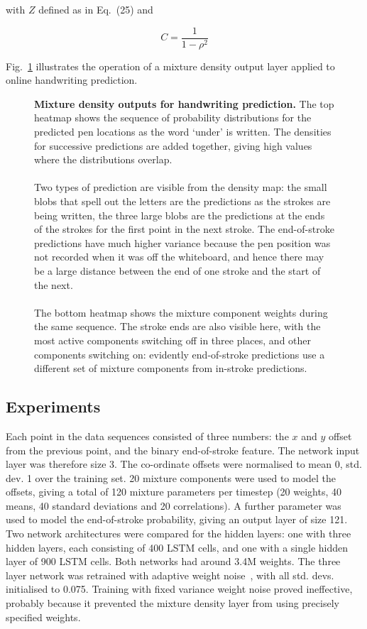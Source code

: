 with $Z$ defined as in Eq.~(25) and

\begin{equation}
C = \frac{1}{1- \rho^2}
\end{equation}

Fig.~\ref{fig:pred_density} illustrates the operation of a mixture density output layer applied to online handwriting prediction.

\begin{figure}
\begin{center}

\end{center}
\caption[Mixture density outputs for handwriting prediction.]{\textbf{Mixture density outputs for handwriting prediction.} The top heatmap shows the sequence of probability distributions for the predicted pen locations as the word `under' is written. The densities for successive predictions are added together, giving high values where the distributions overlap.\\\\
Two types of prediction are visible from the density map: the small blobs that spell out the letters are the predictions as the strokes are being written, the three large blobs are the predictions at the ends of the strokes for the first point in the next stroke. The end-of-stroke predictions have much higher variance because the pen position was not recorded when it was off the whiteboard, and hence there may be a large distance between the end of one stroke and the start of the next. \\\\
The bottom heatmap shows the mixture component weights during the same sequence. The stroke ends are also visible here, with the most active components switching off in three places, and other components switching on: evidently end-of-stroke predictions use a different set of mixture components from in-stroke predictions.}
\label{fig:pred_density}
\end{figure}

\subsection{Experiments}
Each point in the data sequences consisted of three numbers: the $x$ and $y$ offset from the previous point, and the binary end-of-stroke feature. The network input layer was therefore size 3. The co-ordinate offsets were normalised to mean 0, std. dev. 1 over the training set. 20 mixture components were used to model the offsets, giving a total of 120 mixture parameters per timestep (20 weights, 40 means, 40 standard deviations and 20 correlations). A further parameter was used to model the end-of-stroke probability, giving an output layer of size 121. Two network architectures were compared for the hidden layers: one with three hidden layers, each consisting of 400 LSTM cells, and one with a single hidden layer of 900 LSTM cells. Both networks had around 3.4M weights. The three layer network was retrained with adaptive weight noise~\cite{graves11nips}, with all std. devs. initialised to 0.075. Training with fixed variance weight noise proved ineffective, probably because it prevented the mixture density layer from using precisely specified weights.

